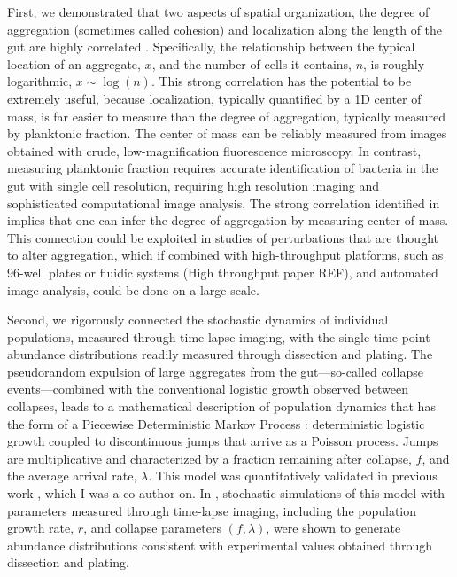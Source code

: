 First, we demonstrated that two aspects of spatial organization, the degree of aggregation (sometimes called cohesion) and localization along the length of the gut are highly correlated \cite{schlomann_bacterial_2018}. Specifically, the relationship between the typical location of an aggregate, $x$, and the number of cells it contains, $n$, is roughly logarithmic, $x \sim \log(n)$. This strong correlation has the potential to be extremely useful, because localization, typically quantified by a 1D center of mass, is far easier to measure than the degree of aggregation, typically measured by planktonic fraction. The center of mass can be reliably measured from images obtained with crude, low-magnification fluorescence microscopy. In contrast, measuring planktonic fraction requires accurate identification of bacteria in the gut with single cell resolution, requiring high resolution imaging and sophisticated computational image analysis. The strong correlation identified in \cite{schlomann_bacterial_2018} implies that one can infer the degree of aggregation by measuring center of mass. This connection could be exploited in studies of perturbations that are thought to alter aggregation, which if combined with high-throughput platforms, such as 96-well plates or fluidic systems (High throughput paper REF), and automated image analysis, could be done on a large scale.

Second, we rigorously connected the stochastic dynamics of individual populations, measured through time-lapse imaging, with the single-time-point abundance distributions readily measured through dissection and plating. The pseudorandom expulsion of large aggregates from the gut---so-called collapse events---combined with the conventional logistic growth observed between collapses, leads to a mathematical description of population dynamics that has the form of a Piecewise Deterministic Markov Process \cite{hansonBook}: deterministic logistic growth coupled to discontinuous jumps that arrive as a Poisson process. Jumps are multiplicative and characterized by a fraction remaining after collapse, $f$, and the average arrival rate, $\lambda$. This model was quantitatively validated in previous work \cite{wiles_host_2016}, which I was a co-author on. In \cite{wiles_host_2016}, stochastic simulations of this model with parameters measured through time-lapse imaging, including the population growth rate, $r$, and collapse parameters $(f, \lambda)$, were shown to generate abundance distributions consistent with experimental values obtained through dissection and plating. 

